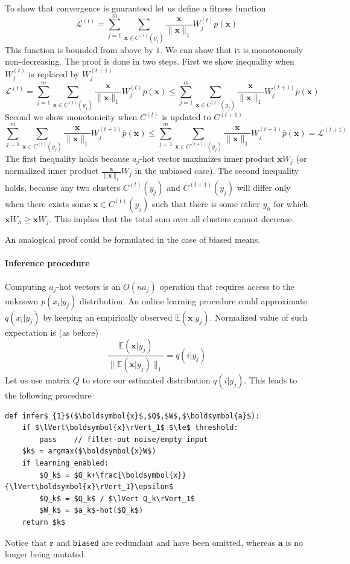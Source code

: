 \documentclass[12pt]{article}
\begin{document}
To show that convergence is guaranteed let us define a fitness function
\[
\mathcal{L}^{(t)} = \sum_{j=1}^m \sum_{\boldsymbol{x}\in C^{(t)}(y_j)} \frac{\boldsymbol{x}}{\lVert \boldsymbol{x} \rVert_1} W_j^{(t)} \bar{p}(\boldsymbol{x})
\] 
This function is bounded from above by $1$. We can show that it is monotonously non-decreasing. The proof is done in two steps. First we show inequality when $W_j^{(t)}$  is replaced by $W_j^{(t+1)}$
\[\mathcal{L}^{(t)}= \sum_{j=1}^m \sum_{\boldsymbol{x}\in C^{(t)}(y_j)} \frac{\boldsymbol{x}}{\lVert \boldsymbol{x} \rVert_1} W_j^{(t)} \bar{p}(\boldsymbol{x}) \le \sum_{j=1}^m \sum_{\boldsymbol{x}\in C^{(t)}(y_j)} \frac{\boldsymbol{x}}{\lVert \boldsymbol{x} \rVert_1} W_j^{(t+1)} \bar{p}(\boldsymbol{x})\] 
Second we show monotonicity when $C^{(t)}$ is updated to $C^{(t+1)}$
\[\sum_{j=1}^m \sum_{\boldsymbol{x}\in C^{(t)}(y_j)} \frac{\boldsymbol{x}}{\lVert \boldsymbol{x} \rVert_1} W_j^{(t+1)} \bar{p}(\boldsymbol{x}) \le \sum_{j=1}^m \sum_{\boldsymbol{x}\in C^{(t+1)}(y_j)} \frac{\boldsymbol{x}}{\lVert \boldsymbol{x} \rVert_1} W_j^{(t+1)} \bar{p}(\boldsymbol{x})=\mathcal{L}^{(t+1)}\] 
The first inequality holds because $a_j$-hot vector maximizes inner product $\boldsymbol{x}W_j$ (or normalized inner product $\frac{\boldsymbol{x}}{\lVert\boldsymbol{x}\rVert_1}W_j$ in the unbiased case). 
The second inequality holds, because any two clusters $C^{(t)}(y_j)$ and  $C^{(t+1)}(y_j)$ will differ only when there exists some $\boldsymbol{x}\in C^{(t)}(y_j)$ such that there is some other $y_h$ for which $\boldsymbol{x}W_h \ge \boldsymbol{x} W_j$. This implies that the total sum over all clusters cannot decrease.

An analogical proof could be formulated in the case of biased  means.

\paragraph{Inference procedure}
Computing $a_j$-hot vectors is an $O(na_j)$ operation that requires access to the unknown $p(x_i|y_j)$ distribution. An online learning procedure could approximate $q(x_i|y_j)$  by keeping an empirically observed $\mathbb{E}(\boldsymbol{x}|y_j)$. Normalized value of such expectation is (as before)
\[
\frac{\mathbb{E}(\boldsymbol{x}|y_j)}{\lVert \mathbb{E}(\boldsymbol{x}|y_j) \rVert_1} = q(i|y_j)
\]
Let us use matrix $Q$ to store our estimated distribution $q(i|y_j)$. This leads to the following procedure
\begin{lstlisting}
def infer$_{1}$($\boldsymbol{x}$,$Q$,$W$,$\boldsymbol{a}$):
    if $\lVert\boldsymbol{x}\rVert_1$ $\le$ threshold:
        pass    // filter-out noise/empty input
    $k$ = argmax($\boldsymbol{x}W$)
    if learning_enabled:
        $Q_k$ = $Q_k+\frac{\boldsymbol{x}}{\lVert\boldsymbol{x}\rVert_1}\epsilon$
        $Q_k$ = $Q_k$ / $\lVert Q_k\rVert_1$
        $W_k$ = $a_k$-hot($Q_k$)
    return $k$
\end{lstlisting}
Notice that $\boldsymbol{r}$ and \texttt{biased} are redundant and have been omitted, whereas $\boldsymbol{a}$ is no longer being mutated.
\end{document}

